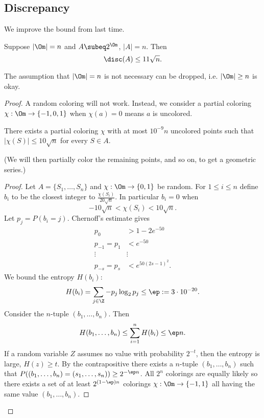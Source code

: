 
\subsection{Discrepancy}
We improve the bound from last time.
\begin{thm}[Spencer]
Suppose $|\Om|=n$ and $A\subeq 2^{\Om}$, $|A|=n$. Then
\[
\disc(A)\le 11\sqrt n.
\]
\end{thm}
The assumption that $|\Om|=n$ is not necessary can be dropped, i.e. $|\Om|\ge n$ is okay.

%
\begin{proof}
A random coloring will not work. Instead, we consider a partial coloring $\chi:\Om\to \{-1,0,1\}$ when $\chi(a)=0$ means $a$ is uncolored.
\begin{lem}
There exists a partial coloring $\chi$ with at most $10^{-9}n$ uncolored points such that $|\chi(S)|\le 10\sqrt n$ for every $S\in A$. 
\end{lem}
(We will then partially color the remaining points, and so on, to get a geometric series.)
\begin{proof}
Let $A=\{S_1,\ldots, S_n\}$ and $\chi:\Om\to \{0,1\}$ be random. %
For $1\le i\le n$ define $b_i$ to be the closest integer to $\frac{\chi(S_i)}{20\sqrt n}$. In particular $b_i=0$ when
\[
-10\sqrt n<\chi(S_i)<10\sqrt n.
\]
Let $p_j=P(b_i=j)$. 
Chernoff's estimate gives
\begin{align*}
p_0&>1-2e^{-50}\\
p_{-1}=p_1&<e^{-50}\\
\vdots&\vdots\\
p_{-s}=p_s&<e^{50(2s-1)^2}.
\end{align*}
We bound the entropy $H(b_i)$:
\[
H(b_i)=\sum_{j\in \Z} -p_j\log_2 p_j\le \ep:=3\cdot 10^{-20}.
\]
Consider the $n$-tuple $(b_1,\ldots, b_n)$. Then
\[
H(b_1,\ldots, b_n)\le \sum_{i=1}^n H(b_i)\le \ep n.
\]
If a random variable $Z$ assumes no value with probability $2^{-t}$, then the entropy is large, $H(z)\ge t$. By the contrapositive there exists a $n$-tuple $(b_1,\ldots, b_n)$ such that $P((b_1,\ldots, b_n)=(s_1,\ldots, s_n))\ge 2^{-\ep n}$. All $2^n$ colorings are equally likely so there exists a set of at least $2^{(1-\ep)n}$ colorings $\chi:\Om\to \{-1,1\}$ all having the same value $(b_1,\ldots, b_n)$.


\end{proof}
\end{proof}
